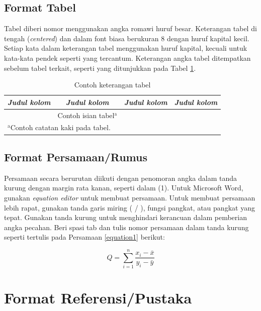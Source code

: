 \documentclass[conference, a4paper]{IEEEtran_ID}
\begin{document}
\subsection{Format Tabel}
	
	Tabel diberi nomor menggunakan angka romawi huruf besar. Keterangan tabel di tengah (\textit{centered}) dan dalam font biasa berukuran 8 dengan huruf kapital kecil. Setiap kata dalam keterangan tabel menggunakan huruf kapital, kecuali untuk kata-kata pendek seperti yang tercantum. Keterangan angka tabel ditempatkan sebelum tabel terkait, seperti yang ditunjukkan pada Tabel \ref{tbl_sample}.

	\begin{table}[htbp]
		\caption{Contoh keterangan tabel}
		\begin{center}
		\begin{tabular}{|c|c|c|c|}
			\hline
			\textbf{\textit{Judul kolom}} & \textbf{\textit{Judul kolom}} & \textbf{\textit{Judul kolom}}& \textbf{\textit{Judul kolom}} \\
			\hline
			& Contoh isian tabel$^{\mathrm{a}}$& &  \\[2ex]
			\hline
			\multicolumn{4}{l}{$^{\mathrm{a}}$Contoh catatan kaki pada tabel.}
		\end{tabular}
		\label{tbl_sample}
		\end{center}
	\end{table}




\subsection{Format Persamaan/Rumus}
	Persamaan secara berurutan diikuti dengan penomoran angka dalam tanda kurung dengan margin rata kanan, seperti dalam (1). Untuk Microsoft Word, gunakan \textit{equation editor} untuk membuat persamaan. Untuk membuat persamaan lebih rapat, gunakan tanda garis miring ( / ), fungsi pangkat, atau pangkat yang tepat. Gunakan tanda kurung untuk menghindari kerancuan dalam pemberian angka pecahan. Beri spasi tab dan tulis nomor persamaan dalam tanda kurung seperti tertulis pada Persamaan \ref{equation1} berikut: 

	\begin{equation}	
		Q = \sum^n_{i=1} \frac{x_i - \bar{x}}{y_i - \bar{y}}
		\label{equation1}
	\end{equation}	


\section{Format Referensi/Pustaka}
\end{document}
